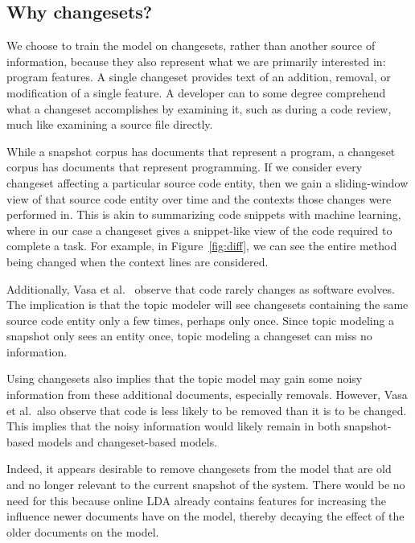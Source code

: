 \subsection{Why changesets?}

We choose to train the model on changesets, rather than another source of
information, because they also represent what we are primarily interested in:
program features. A single changeset provides text of an addition, removal, or
modification of a single feature. A developer can to some degree comprehend what
a changeset accomplishes by examining it, such as during a code review, much
like examining a source file directly.

While a snapshot corpus has documents that represent a program, a changeset
corpus has documents that represent programming. If we consider every changeset
affecting a particular source code entity, then we gain a sliding-window view of
that source code entity over time and the contexts those changes were performed
in. This is akin to summarizing code snippets with machine
learning\cite{Ying-Robillard_2013}, where in our case a changeset gives a
snippet-like view of the code required to complete a task. For example, in
Figure~\ref{fig:diff}, we can see the entire method being changed when the
context lines are considered.

Additionally, Vasa et al.~\cite{Vasa-etal_2007} observe that code rarely changes
as software evolves. The implication is that the topic modeler will see
changesets containing the same source code entity only a few times, perhaps only
once. Since topic modeling a snapshot only sees an entity once, topic modeling a
changeset can miss no information.

Using changesets also implies that the topic model may gain some noisy
information from these additional documents, especially removals. However, Vasa
et al.\ also observe that code is less likely to be removed than it is to be
changed. This implies that the noisy information would likely remain in both
snapshot-based models and changeset-based models.

Indeed, it appears desirable to remove changesets from the model that are old
and no longer relevant to the current snapshot of the system. There would be no
need for this because online LDA already contains features for increasing the
influence newer documents have on the model, thereby decaying the effect of the
older documents on the model.


